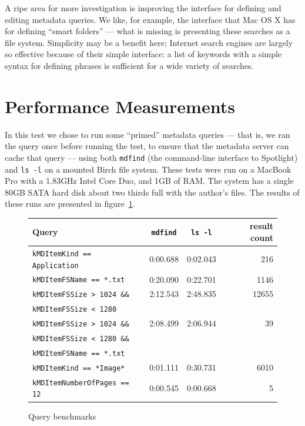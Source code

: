 \documentclass{article}
\begin{document}
A ripe area for more investigation is improving the interface for
defining and editing metadata queries. We like, for example, the
interface that Mac OS X has for defining ``smart folders'' ---
what is missing is presenting these searches as a file system.
Simplicity may be a benefit here; Internet search engines are largely
so effective because of their simple interface: a list of keywords
with a simple syntax for defining phrases is sufficient for a wide
variety of searches.

\section{Performance Measurements}

In this test we chose to run some ``primed'' metadata queries --- that
is, we ran the query once before running the test, to ensure that the
metadata server can cache that query --- using both \texttt{mdfind}
(the command-line interface to Spotlight) and \texttt{ls -l} on a
mounted Birch file system. These tests were run on a MacBook Pro with
a 1.83GHz Intel Core Duo, and 1GB of RAM. The system has a single 80GB
SATA hard disk about two thirds full with the author's files. The
results of these runs are presented in figure~\ref{fig:benchmarks}.

\begin{figure}[ht!]
\begin{center}
\begin{tabular}{|l|c|c|r|} \hline
 \textbf{Query} & \texttt{mdfind}   & \texttt{ls -l} & \textbf{result count} \\ \hline \hline
\texttt{kMDItemKind == Application} & 0:00.688 & 0:02.043 &   216 \\ \hline
\texttt{kMDItemFSName == *.txt}     & 0:20.090 & 0:22.701 &  1146 \\ \hline
\texttt{kMDItemFSSize > 1024 \&\&}  & 2:12.543 & 2:48.835 & 12655 \\
\texttt{kMDItemFSSize < 1280}       &          &          &       \\ \hline
\texttt{kMDItemFSSize > 1024 \&\&}  & 2:08.499 & 2:06.944 &    39 \\
\texttt{kMDItemFSSize < 1280 \&\&}  &          &          &       \\ 
\texttt{kMDItemFSName == *.txt}     &          &          &       \\ \hline
\texttt{kMDItemKind == *Image*}     & 0:01.111 & 0:30.731 &  6010 \\ \hline
\texttt{kMDItemNumberOfPages == 12} & 0:00.545 & 0:00.668 &     5 \\ \hline
\end{tabular}
\caption{Query benchmarks}
\label{fig:benchmarks}
\end{center}
\end{figure}
\end{document}
